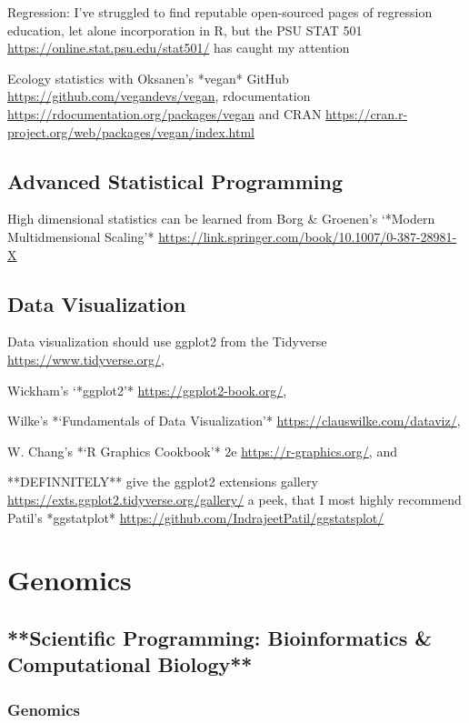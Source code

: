 \documentclass[
]{book}
\begin{document}
Regression: I've struggled to find reputable open-sourced pages of regression education, let alone incorporation in R, but the PSU STAT 501 \url{https://online.stat.psu.edu/stat501/} has caught my attention

Ecology statistics with Oksanen's *vegan* GitHub \url{https://github.com/vegandevs/vegan}, rdocumentation \url{https://rdocumentation.org/packages/vegan} and CRAN \url{https://cran.r-project.org/web/packages/vegan/index.html}

\section{Advanced Statistical Programming}\label{advanced-statistical-programming}

High dimensional statistics can be learned from Borg \& Groenen's `*Modern Multidmensional Scaling'* \url{https://link.springer.com/book/10.1007/0-387-28981-X}

\section{Data Visualization}\label{data-visualization}

Data visualization should use ggplot2 from the Tidyverse \url{https://www.tidyverse.org/},

Wickham's `*ggplot2'* \url{https://ggplot2-book.org/},

Wilke's *`Fundamentals of Data Visualization'* \url{https://clauswilke.com/dataviz/},

W. Chang's *`R Graphics Cookbook'* 2e \url{https://r-graphics.org/}, and

**DEFINNITELY** give the ggplot2 extensions gallery \url{https://exts.ggplot2.tidyverse.org/gallery/} a peek, that I most highly recommend Patil's *ggstatplot* \url{https://github.com/IndrajeetPatil/ggstatsplot/}

\chapter{Genomics}\label{genomics}

\section{**Scientific Programming: Bioinformatics \& Computational Biology**}\label{scientific-programming-bioinformatics-computational-biology}

\subsection{Genomics}\label{genomics-1}
\end{document}
